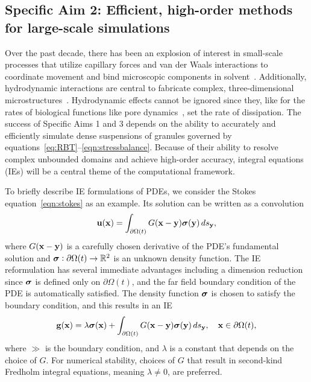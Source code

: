 \subsection{Specific Aim 2: Efficient, high-order methods for
large-scale simulations}
\label{sec:specificaim2}
Over the past decade, there has been an explosion of interest in
small-scale processes that utilize capillary forces and van der Waals
interactions to coordinate movement and bind microscopic components in
solvent~\cite{Pandey2011, Zhang2017, Siontorou2017}. Additionally,
hydrodynamic interactions are central to
fabricate complex,
three-dimensional microstructures~\cite{Dasgupta2017, Leong2007,
  Reynolds2019, Cho2010}.
Hydrodynamic effects cannot be ignored since
they, like for the rates of biological functions like pore
dynamics~\cite{RYHAM20112929}, set the rate of dissipation. The success
of Specific Aims 1 and 3 depends on the ability to accurately and
efficiently simulate dense suspensions of granules governed by
equations~\eqref{eq:RBT}--\eqref{eqn:stressbalance}. Because of their
ability to resolve complex unbounded domains and achieve high-order
accuracy, integral equations (IEs) will be a central theme of the
computational framework. 

To briefly describe IE formulations of PDEs, we consider the Stokes
equation~\eqref{eqn:stokes} as an example. Its solution can be written
as a convolution 
\begin{align*}
  \mathbf{u}(\mathbf{x}) = \int_{\partial\Omega(t)} G(\mathbf{x} - \mathbf{y}) \boldsymbol{\sigma}(\mathbf{y}) \, ds_{\mathbf{y}},
\end{align*}
where $G(\mathbf{x} - \mathbf{y})$ is a carefully chosen derivative of the PDE's
fundamental solution and $\boldsymbol{\sigma}: \partial \Omega(t) \rightarrow \mathbb{R}^2$
is an unknown density function. The IE reformulation has several
immediate advantages including a dimension reduction since $\boldsymbol{\sigma}$ is
defined only on $\partial \Omega(t)$, and the far field boundary
condition of the PDE is automatically satisfied. The density
function $\boldsymbol{\sigma}$ is chosen to satisfy the boundary condition, and this
results in an IE 
\begin{align*}
  \mathbf{g}(\mathbf{x}) = \lambda \boldsymbol{\sigma}(\mathbf{x}) + 
    \int_{\partial\Omega(t)} G(\mathbf{x} - \mathbf{y}) \boldsymbol{\sigma}(\mathbf{y}) \, ds_{\mathbf{y}},
    \quad \mathbf{x} \in \partial\Omega(t),
\end{align*}
where $\gg$ is the boundary condition, and $\lambda$ is a constant that
depends on the choice of $G$. For numerical stability, choices of $G$
that result in second-kind Fredholm integral equations, meaning $\lambda
\neq 0$, are preferred.

